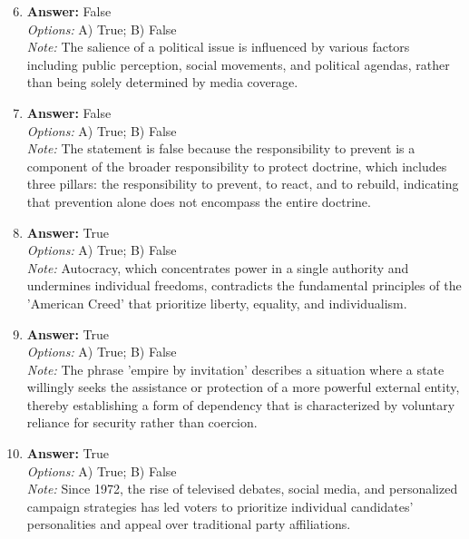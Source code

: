 \documentclass[12pt]{article}
\begin{document}
\begin{enumerate}[label=\arabic*.]
\setcounter{enumi}{5}
\item \textbf{Answer:} False
\\ \textit{Options:} A) True; B) False
\\ \textit{Note:} The salience of a political issue is influenced by various factors including public perception, social movements, and political agendas, rather than being solely determined by media coverage.
\item \textbf{Answer:} False
\\ \textit{Options:} A) True; B) False
\\ \textit{Note:} The statement is false because the responsibility to prevent is a component of the broader responsibility to protect doctrine, which includes three pillars: the responsibility to prevent, to react, and to rebuild, indicating that prevention alone does not encompass the entire doctrine.
\item \textbf{Answer:} True
\\ \textit{Options:} A) True; B) False
\\ \textit{Note:} Autocracy, which concentrates power in a single authority and undermines individual freedoms, contradicts the fundamental principles of the 'American Creed' that prioritize liberty, equality, and individualism.
\item \textbf{Answer:} True
\\ \textit{Options:} A) True; B) False
\\ \textit{Note:} The phrase 'empire by invitation' describes a situation where a state willingly seeks the assistance or protection of a more powerful external entity, thereby establishing a form of dependency that is characterized by voluntary reliance for security rather than coercion.
\item \textbf{Answer:} True
\\ \textit{Options:} A) True; B) False
\\ \textit{Note:} Since 1972, the rise of televised debates, social media, and personalized campaign strategies has led voters to prioritize individual candidates' personalities and appeal over traditional party affiliations.
\end{enumerate}
\end{document}
